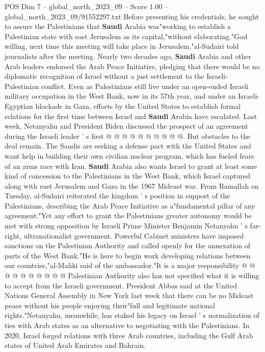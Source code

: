 \begin{textsample}{POS Dim 7 – global\_north\_2023\_09 – Score 1.00 – global\_north\_2023\_09/91552297.txt}
Before presenting his credentials, he sought to assure the Palestinians that \textbf{Saudi} Arabia was"working to establish a Palestinian state with east Jerusalem as its capital,"without elaborating."God willing, next time this meeting will take place in Jerusalem,"al-Sudairi told journalists after the meeting.
Nearly two decades ago, \textbf{Saudi} Arabia and other Arab leaders endorsed the Arab Peace Initiative, pledging that there would be no diplomatic recognition of Israel without a just settlement to the Israeli-Palestinian conflict.
Even as Palestinians still live under an open-ended Israeli military occupation in the West Bank, now in its 57th year, and under an Israeli-Egyptian blockade in Gaza, efforts by the United States to establish formal relations for the first time between Israel and \textbf{Saudi} Arabia have escalated.
Last week, Netanyahu and President Biden discussed the prospect of an agreement during the Israeli leader ' s first @ @ @ @ @ @ @ @ @ @.
But obstacles to the deal remain.
The Saudis are seeking a defense pact with the United States and want help in building their own civilian nuclear program, which has fueled fears of an arms race with Iran. \textbf{Saudi} Arabia also wants Israel to grant at least some kind of concession to the Palestinians in the West Bank, which Israel captured along with east Jerusalem and Gaza in the 1967 Mideast war.
From Ramallah on Tuesday, al-Sudairi reiterated the kingdom ' s position in support of the Palestinians, describing the Arab Peace Initiative as a"fundamental pillar of any agreement."Yet any effort to grant the Palestinians greater autonomy would be met with strong opposition by Israeli Prime Minister Benjamin Netanyahu ' s far-right, ultranationalist government.
Powerful Cabinet ministers have imposed sanctions on the Palestinian Authority and called openly for the annexation of parts of the West Bank."He is here to begin work developing relations between our countries,"al-Maliki said of the ambassador."It is a major responsibility @ @ @ @ @ @ @ @ @ @ Palestinian Authority also has not specified what it is willing to accept from the Israeli government.
President Abbas said at the United Nations General Assembly in New York last week that there can be no Mideast peace without his people enjoying their"full and legitimate national rights."Netanyahu, meanwhile, has staked his legacy on Israel ' s normalization of ties with Arab states as an alternative to negotiating with the Palestinians.
In 2020, Israel forged relations with three Arab countries, including the Gulf Arab states of United Arab Emirates and Bahrain.

\end{textsample}
